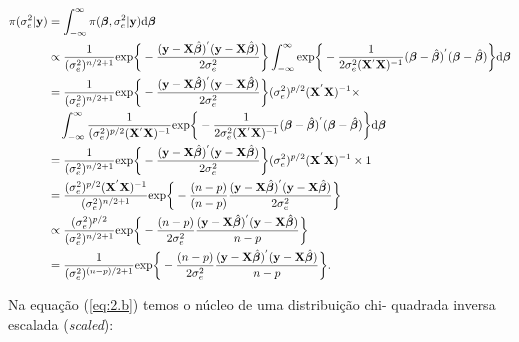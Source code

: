 \documentclass[12pt, oldfontcommands]{article}\usepackage[]{graphicx}\usepackage[]{color}
\begin{document}
\begin{align}
\begin{split}
 \pi(\sigma_{e}^{2}|\mathbf{y}) & =
 \int_{-\infty}^{\infty} \pi(\bm{\beta}, \sigma_{e}^{2}|\mathbf{y})
 {\rm d}\bm{\beta} \\ & \propto
 \frac{1}{(\sigma_{e}^{2})^{n/2 + 1}}
 {\rm exp}\bigg\{-\frac{(\mathbf{y} - \mathbf{X} \hat{\bm{\beta}})^{'}
 (\mathbf{y} - \mathbf{X} \hat{\bm{\beta}})}{2\sigma_{e}^{2}}\bigg\}
 \int_{-\infty}^{\infty} {\rm exp}\bigg\{
 -\frac{1}{2\sigma_{e}^{2}(\mathbf{X}^{'}\mathbf{X})^{-1}}
 (\bm{\beta} - \hat{\bm{\beta}})^{'}
 (\bm{\beta} - \hat{\bm{\beta}})\bigg\}{\rm d}\bm{\beta} \\ & =
 \frac{1}{(\sigma_{e}^{2})^{n/2 + 1}}
 {\rm exp}\bigg\{-\frac{(\mathbf{y} - \mathbf{X} \hat{\bm{\beta}})^{'}
 (\mathbf{y} - \mathbf{X} \hat{\bm{\beta}})}{2\sigma_{e}^{2}}\bigg\}
 (\sigma_{e}^{2})^{p/2}(\mathbf{X}^{'}\mathbf{X})^{-1} \times \\ & \quad
 \int_{-\infty}^{\infty}
 \frac{1}{(\sigma_{e}^{2})^{p/2}(\mathbf{X}^{'}\mathbf{X})^{-1}}
 {\rm exp}\bigg\{
 -\frac{1}{2\sigma_{e}^{2}(\mathbf{X}^{'}\mathbf{X})^{-1}}
 (\bm{\beta} - \hat{\bm{\beta}})^{'}
 (\bm{\beta} - \hat{\bm{\beta}})\bigg\}{\rm d}\bm{\beta} \\ & =
 \frac{1}{(\sigma_{e}^{2})^{n/2 + 1}}
 {\rm exp}\bigg\{-\frac{(\mathbf{y} - \mathbf{X} \hat{\bm{\beta}})^{'}
 (\mathbf{y} - \mathbf{X} \hat{\bm{\beta}})}{2\sigma_{e}^{2}}\bigg\}
 (\sigma_{e}^{2})^{p/2}(\mathbf{X}^{'}\mathbf{X})^{-1} \times 1 \\ & =
 \frac{(\sigma_{e}^{2})^{p/2}(\mathbf{X}^{'}\mathbf{X})^{-1}}{
 (\sigma_{e}^{2})^{n/2 + 1}}{\rm exp}\bigg\{-\frac{(n - p)}{(n - p)}
 \frac{(\mathbf{y} - \mathbf{X} \hat{\bm{\beta}})^{'}
 (\mathbf{y} - \mathbf{X} \hat{\bm{\beta}})}{2\sigma_{e}^{2}}\bigg\}
 \\ & \propto \frac{(\sigma_{e}^{2})^{p/2}}{(\sigma_{e}^{2})^{n/2 + 1}}
 {\rm exp}\bigg\{-\frac{(n - p)}{2\sigma_{e}^{2}}
 \frac{(\mathbf{y} - \mathbf{X} \hat{\bm{\beta}})^{'}
 (\mathbf{y} - \mathbf{X} \hat{\bm{\beta}})}{n - p}\bigg\} \label{eq:2.b}
 \\ & = \frac{1}{(\sigma_{e}^{2})^{(n - p)/2 + 1}}
 {\rm exp}\bigg\{-\frac{(n - p)}{2\sigma_{e}^{2}}
 \frac{(\mathbf{y} - \mathbf{X} \hat{\bm{\beta}})^{'}
 (\mathbf{y} - \mathbf{X} \hat{\bm{\beta}})}{n - p}\bigg\}.
\end{split}
\end{align}

Na equação (\ref{eq:2.b}) temos o núcleo de uma distribuição chi-
quadrada inversa escalada (\textit{scaled}):
\end{document}
